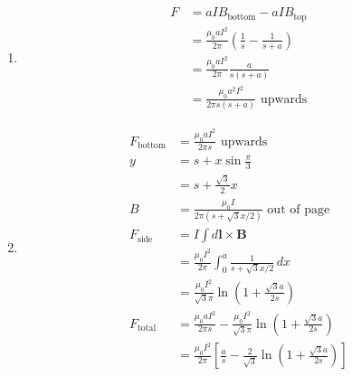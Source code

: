 \documentclass{article}
\renewcommand{\vec}[1]{\boldsymbol{\mathbf{#1}}}
\begin{document}
\subsection{}

\begin{enumerate}
  \item

        \begin{align*}
          F & = a I B_\text{bottom} - a I B_\text{top}                                 \\
            & = \frac{\mu_0 a I^2}{2 \pi} \left( \frac{1}{s} - \frac{1}{s + a} \right) \\
            & = \frac{\mu_0 a I^2}{2 \pi} \frac{a}{s (s + a)}                          \\
            & = \frac{\mu_0 a^2 I^2}{2 \pi s (s + a)} \text{ upwards}
        \end{align*}

  \item

        \begin{align*}
          F_\text{bottom} & = \frac{\mu_0 a I^2}{2 \pi s} \text{ upwards}                                                                           \\
          y               & = s + x \sin \frac{\pi}{3}                                                                                              \\
                          & = s + \frac{\sqrt{3}}{2} x                                                                                              \\
          B               & = \frac{\mu_0 I}{2 \pi (s + \sqrt{3} x / 2)} \text{ out of page}                                                        \\
          F_\text{side}   & = I \int d \vec{l} \times \vec{B}                                                                                       \\
                          & = \frac{\mu_0 I^2}{2 \pi} \int_0^a \frac{1}{s + \sqrt{3} x / 2} \,d x                                                   \\
                          & = \frac{\mu_0 I^2}{\sqrt{3} \pi} \ln \left( 1 + \frac{\sqrt{3} a}{2 s} \right)                                          \\
          F_\text{total}  & = \frac{\mu_0 a I^2}{2 \pi s} - \frac{\mu_0 I^2}{\sqrt{3} \pi} \ln \left( 1 + \frac{\sqrt{3} a}{2 s} \right)            \\
                          & = \frac{\mu_0 I^2}{2 \pi} \left[ \frac{a}{s} - \frac{2}{\sqrt{3}} \ln \left( 1 + \frac{\sqrt{3} a}{2 s} \right) \right]
        \end{align*}
\end{enumerate}
\end{document}
